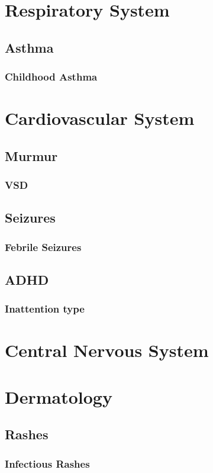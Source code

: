 \documentclass[
]{book}
\begin{document}
\part{Respiratory System}\label{part-respiratory-system}

\chapter{Asthma}\label{Asthma}

\section{Childhood Asthma}\label{ChAs}

\part{Cardiovascular System}\label{part-cardiovascular-system}

\chapter{Murmur}\label{Murmur}

\section{VSD}\label{VSD}

\chapter{Seizures}\label{Seizures}

\section{Febrile Seizures}\label{FebSz}

\chapter{ADHD}\label{ADHD}

\section{Inattention type}\label{InADHD}

\part{Central Nervous System}\label{part-central-nervous-system}

\part{Dermatology}\label{part-dermatology}

\chapter{Rashes}\label{Rashes}

\section{Infectious Rashes}\label{InfRash}

  
\end{document}
